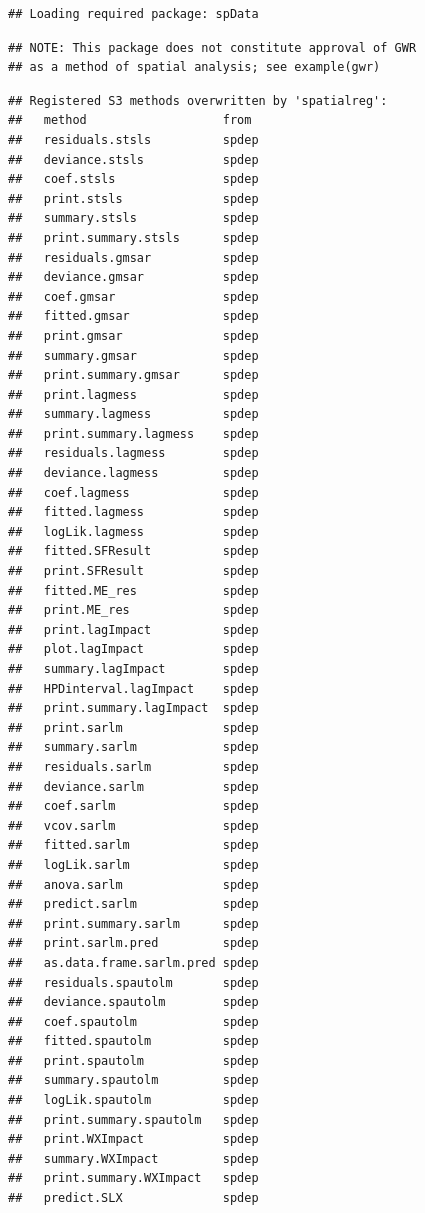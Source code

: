 \documentclass[
]{book}
\begin{document}
\begin{verbatim}
## Loading required package: spData
\end{verbatim}

\begin{verbatim}
## NOTE: This package does not constitute approval of GWR
## as a method of spatial analysis; see example(gwr)
\end{verbatim}

\begin{verbatim}
## Registered S3 methods overwritten by 'spatialreg':
##   method                   from 
##   residuals.stsls          spdep
##   deviance.stsls           spdep
##   coef.stsls               spdep
##   print.stsls              spdep
##   summary.stsls            spdep
##   print.summary.stsls      spdep
##   residuals.gmsar          spdep
##   deviance.gmsar           spdep
##   coef.gmsar               spdep
##   fitted.gmsar             spdep
##   print.gmsar              spdep
##   summary.gmsar            spdep
##   print.summary.gmsar      spdep
##   print.lagmess            spdep
##   summary.lagmess          spdep
##   print.summary.lagmess    spdep
##   residuals.lagmess        spdep
##   deviance.lagmess         spdep
##   coef.lagmess             spdep
##   fitted.lagmess           spdep
##   logLik.lagmess           spdep
##   fitted.SFResult          spdep
##   print.SFResult           spdep
##   fitted.ME_res            spdep
##   print.ME_res             spdep
##   print.lagImpact          spdep
##   plot.lagImpact           spdep
##   summary.lagImpact        spdep
##   HPDinterval.lagImpact    spdep
##   print.summary.lagImpact  spdep
##   print.sarlm              spdep
##   summary.sarlm            spdep
##   residuals.sarlm          spdep
##   deviance.sarlm           spdep
##   coef.sarlm               spdep
##   vcov.sarlm               spdep
##   fitted.sarlm             spdep
##   logLik.sarlm             spdep
##   anova.sarlm              spdep
##   predict.sarlm            spdep
##   print.summary.sarlm      spdep
##   print.sarlm.pred         spdep
##   as.data.frame.sarlm.pred spdep
##   residuals.spautolm       spdep
##   deviance.spautolm        spdep
##   coef.spautolm            spdep
##   fitted.spautolm          spdep
##   print.spautolm           spdep
##   summary.spautolm         spdep
##   logLik.spautolm          spdep
##   print.summary.spautolm   spdep
##   print.WXImpact           spdep
##   summary.WXImpact         spdep
##   print.summary.WXImpact   spdep
##   predict.SLX              spdep
\end{verbatim}
\end{document}
